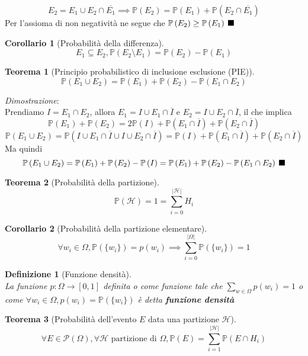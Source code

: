 \documentclass{article}
\newtheorem{theorem}{Teorema}[section]
\newtheorem{corollary}{Corollario}[theorem]
\newtheorem{definition}{Definizione}[section]
\newcommand{\qed}{\rule{0.7em}{0.7em}}
\newcommand{\PS}[1]{\mathcal{P}\left(#1\right)}
\newcommand{\Prob}[1]{\mathbb{P}\left(#1\right)}
\begin{document}
        $$E_2 = E_1 \cup E_2 \cap \overline{E_1} \implies \Prob{E_2} = \Prob{E_1} + \Prob{E_2 \cap \overline{E_1}}$$
        Per l'assioma di non negatività ne segue che $\Prob{E_2} \geq \Prob{E_1} \; \qed$
    \begin{corollary}[Probabilità della differenza]
        $$E_1 \subseteq E_2, \Prob{E_2 \setminus E_1} = \Prob{E_2} - \Prob{E_1}$$
    \end{corollary}
    \begin{theorem}[Principio probabilistico di inclusione esclusione (PIE)]
        $$\Prob{E_1 \cup E_2} = \Prob{E_1} + \Prob{E_2} - \Prob{E_1 \cap E_2}$$
    \end{theorem}
    \textit{Dimostrazione}: \\
        Prendiamo $I = E_1 \cap E_2$, allora $E_1 = I \cup E_1 \cap \overline{I}$ e $E_2 = I \cup E_2 \cap \overline{I}$, il che implica 
        $$\Prob{E_1} + \Prob{E_2} = 2\Prob{I} + \Prob{E_1 \cap \overline{I}} + \Prob{E_2 \cap \overline{I}}$$
        $$\Prob{E_1 \cup E_2} = \Prob{I \cup E_1 \cap \overline{I} \cup I \cup E_2 \cap \overline{I}} = \Prob{I} + \Prob{E_1 \cap \overline{I}} + 
            \Prob{E_2 \cap \overline{I}}$$
        Ma quindi $$\Prob{E_1 \cup E_2} = \Prob{E_1} + \Prob{E_2} - \Prob{I} = \Prob{E_1} + \Prob{E_2} - \Prob{E_1 \cap E_2} \; \qed$$
    \begin{theorem}[Probabilità della partizione]
        $$\Prob{\mathcal{H}} = 1 = \sum_{i=0}^{|\mathcal{H}|}H_i$$
    \end{theorem}
    \begin{corollary}[Probabilità della partizione elementare]
        $$\forall w_i \in \Omega, \Prob{\{w_i\}} = p\left(w_i\right) \implies \sum_{i=0}^{|\Omega|}\Prob{\{w_i\}} = 1$$
    \end{corollary}
    \begin{definition}[Funzione densità] \, \\
        La funzione $p: \Omega \to \left[0,1\right]$ definita o come funzione tale che $\sum_{w \in \Omega} p\left(w_i\right) = 1$
        o come $\forall w_i \in \Omega, p\left(w_i\right) = \Prob{\{w_i\}}$ è detta \textbf{funzione densità}
    \end{definition}
    \begin{theorem}[Probabilità dell'evento $E$ data una partizione $\mathcal{H}$]
        $$\forall E \in \PS{\Omega}, \forall \mathcal{H} \textrm{ partizione di } \Omega, 
            \Prob{E} = \sum_{i=1}^{|\mathcal{H}|}\Prob{E \cap H_i}$$
    \end{theorem}
\end{document}
